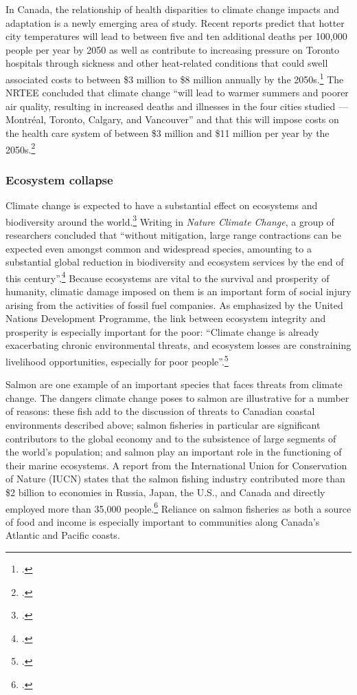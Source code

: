 \documentclass[10pt]{article}
\begin{document}
In Canada, the relationship of health disparities to climate change impacts and adaptation is a newly emerging area of study. 
Recent reports predict that hotter city temperatures will lead to between five and ten additional deaths per 100,000 people per year by 2050 as well as contribute to increasing pressure on Toronto hospitals through sickness and other heat-related conditions that could swell associated costs to between \$3 million to \$8 million annually by the 2050s.\footcite[][p. 87]{NRTEEPrice}
The NRTEE concluded that climate change ``will lead to warmer summers and poorer air quality, resulting in increased deaths and illnesses in the four cities studied — Montréal, Toronto, Calgary, and Vancouver'' and that this will impose costs on the health care system of between \$3 million and \$11 million per year by the 2050s.\footcite[][p. 16]{NRTEEPrice}



	\subsubsection{Ecosystem collapse}



Climate change is expected to have a substantial effect on ecosystems and biodiversity around the world.\footcite[][p. 1]{VulnerableSpecies}
Writing in \emph{Nature Climate Change}, a group of researchers concluded that ``without mitigation, large range contractions can be expected even amongst common and widespread species, amounting to a substantial global reduction in biodiversity and ecosystem services by the end of this century''.\footcite[][p. 1]{WarrenBiodiversity}
Because ecosystems are vital to the survival and prosperity of humanity, climatic damage imposed on them is an important form of social injury arising from the activities of fossil fuel companies.
As emphasized by the United Nations Development Programme, the link between ecosystem integrity and prosperity is especially important for the poor: ``Climate change is already exacerbating chronic environmental threats, and ecosystem losses are constraining livelihood opportunities, especially for poor people''.\footcite[][p. 95]{UNHumanDev2013}



Salmon are one example of an important species that faces threats from climate change. 
The dangers climate change poses to salmon are illustrative for a number of reasons: these fish add to the discussion of threats to Canadian coastal environments described above; salmon fisheries in particular are significant contributors to the global economy and to the subsistence of large segments of the world’s population; and salmon play an important role in the functioning of their marine ecosystems.
A report from the International Union for Conservation of Nature (IUCN) states that the salmon fishing industry contributed more than \$2 billion to economies in Russia, Japan, the U.S., and Canada and directly employed more than 35,000 people.\footcite[][p. 2]{IUCNSalmon}
Reliance on salmon fisheries as both a source of food and income is especially important to communities along Canada's Atlantic and Pacific coasts. 
\end{document}
